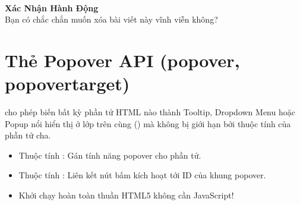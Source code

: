 \begin{browserWindow}
\sffamily\small
{} \\[10pt]

\begin{center}
\begin{tcolorbox}[arc=4pt, colback=white, colframe=primaryBlue, boxsep=8pt, width=0.85\linewidth, halign=center]
  \textbf{\textcolor{primaryBlue}{Xác Nhận Hành Động}} \\[4pt]
  {\small Bạn có chắc chắn muốn xóa bài viết này vĩnh viễn không?} \\[8pt]
   \qquad
\end{tcolorbox}
\end{center}
\end{browserWindow}

\section{Thẻ Popover API (popover, popovertarget)}
\label{sec:popover_api}

\begin{conceptBox}
 cho phép biến bất kỳ phần tử HTML nào thành Tooltip, Dropdown Menu hoặc Popup nổi hiển thị ở lớp trên cùng () mà không bị giới hạn bởi thuộc tính  của phần tử cha.
\begin{itemize}[leftmargin=1.5em, itemsep=2pt, parsep=0pt]
    \item Thuộc tính : Gán tính năng popover cho phần tử.
    \item Thuộc tính : Liên kết nút bấm kích hoạt tới ID của khung popover.
    \item Khởi chạy hoàn toàn thuần HTML5 không cần JavaScript!
\end{itemize}
\end{conceptBox}

